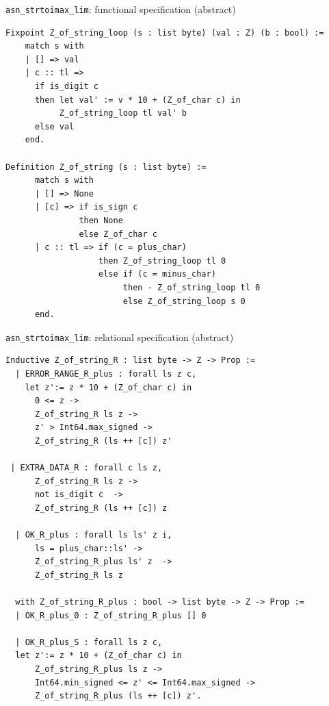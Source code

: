 \documentclass[10pt,usenames,dvipsnames,landscape]{beamer}
\begin{document}
\begin{frame}[fragile]{\texttt{asn\_strtoimax\_lim}: functional specification (abstract)}
\begin{lstlisting}[language=Coq, basicstyle=\fontsize{7}{8}\selectfont\ttfamily]
Fixpoint Z_of_string_loop (s : list byte) (val : Z) (b : bool) := 
    match s with 
    | [] => val
    | c :: tl => 
      if is_digit c
      then let val' := v * 10 + (Z_of_char c) in                           
           Z_of_string_loop tl val' b
      else val             
    end.
    
Definition Z_of_string (s : list byte) := 
      match s with 
      | [] => None
      | [c] => if is_sign c
               then None
               else Z_of_char c
      | c :: tl => if (c = plus_char) 
                   then Z_of_string_loop tl 0 
                   else if (c = minus_char)
                        then - Z_of_string_loop tl 0
                        else Z_of_string_loop s 0                                                                    
      end.   

 \end{lstlisting}


\end{frame}
\begin{frame}[fragile]{\texttt{asn\_strtoimax\_lim}: relational specification (abstract)}
\begin{lstlisting}[language=Coq, basicstyle=\fontsize{7}{8}\selectfont\ttfamily]
 Inductive Z_of_string_R : list byte -> Z -> Prop :=
  | ERROR_RANGE_R_plus : forall ls z c,
    let z':= z * 10 + (Z_of_char c) in
      0 <= z ->
      Z_of_string_R ls z ->
      z' > Int64.max_signed ->
      Z_of_string_R (ls ++ [c]) z'
      
 | EXTRA_DATA_R : forall c ls z,
      Z_of_string_R ls z ->
      not is_digit c  -> 
      Z_of_string_R (ls ++ [c]) z 

  | OK_R_plus : forall ls ls' z i,
      ls = plus_char::ls' ->
      Z_of_string_R_plus ls' z  ->
      Z_of_string_R ls z 

  with Z_of_string_R_plus : bool -> list byte -> Z -> Prop :=
  | OK_R_plus_0 : Z_of_string_R_plus [] 0                      
                               
  | OK_R_plus_S : forall ls z c,
  let z':= z * 10 + (Z_of_char c) in    
      Z_of_string_R_plus ls z ->
      Int64.min_signed <= z' <= Int64.max_signed ->
      Z_of_string_R_plus (ls ++ [c]) z'.
       \end{lstlisting}

\end{frame}
\end{document}
